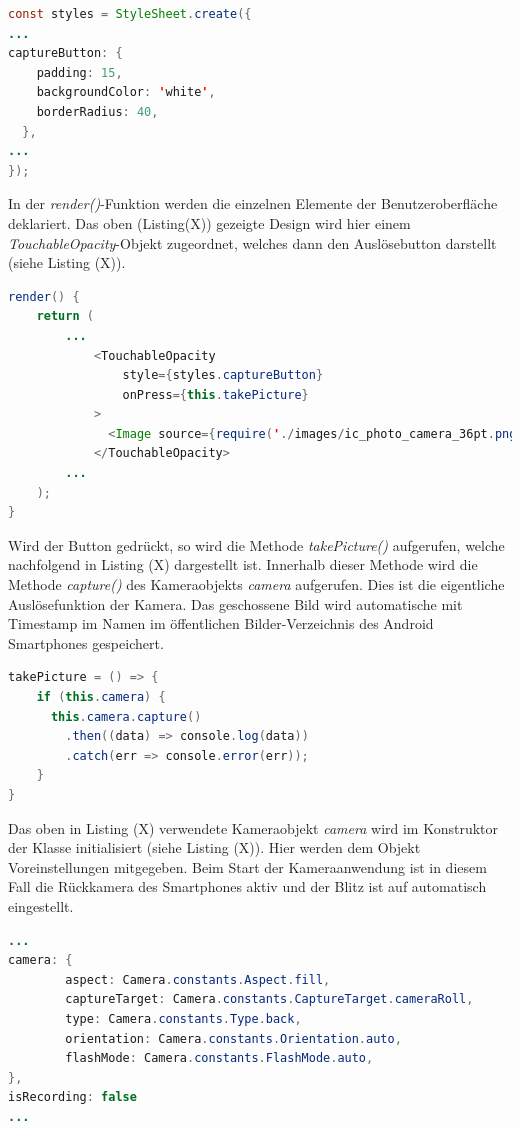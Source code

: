 \begin{lstlisting}[caption=Das Design des Auslösebuttons für die Kamerafunktion, label=lst:styleCaptureButton, language=Java]
const styles = StyleSheet.create({
...
captureButton: {
    padding: 15,
    backgroundColor: 'white',
    borderRadius: 40,
  },
...
});
\end{lstlisting} 

In der \textit{render()}-Funktion werden die einzelnen Elemente der Benutzeroberfläche deklariert. Das oben (Listing(X)) gezeigte Design wird hier einem \textit{TouchableOpacity}-Objekt zugeordnet, welches dann den Auslösebutton darstellt (siehe Listing (X)). 

\begin{lstlisting}[caption=Deklaration eines \textit{TouchableOpacity}-UI-Objekts für die Darstellung des Auslösebuttons der Kamera, label=lst:CaptureButton, language=Java]
render() {
    return (
		...
			<TouchableOpacity
                style={styles.captureButton}
                onPress={this.takePicture}
            >
              <Image source={require('./images/ic_photo_camera_36pt.png')}/>
            </TouchableOpacity>
		...
	);
}
\end{lstlisting} 

Wird der Button gedrückt, so wird die Methode \textit{takePicture()} aufgerufen, welche nachfolgend in Listing (X) dargestellt ist. Innerhalb dieser Methode wird die Methode \textit{capture()} des Kameraobjekts \textit{camera} aufgerufen. Dies ist die eigentliche Auslösefunktion der Kamera. Das geschossene Bild wird automatische mit Timestamp im Namen im öffentlichen Bilder-Verzeichnis des Android Smartphones gespeichert. 

\begin{lstlisting}[caption=Die Methode \textit{takePicture()} zum Auslösen der Kamera, label=lst:takePictureReactNative, language=Java]
takePicture = () => {
    if (this.camera) {
      this.camera.capture()
        .then((data) => console.log(data))
        .catch(err => console.error(err));
    }
}
\end{lstlisting} 

Das oben in Listing (X) verwendete Kameraobjekt \textit{camera} wird im Konstruktor der Klasse initialisiert (siehe Listing (X)). Hier werden dem Objekt Voreinstellungen mitgegeben. Beim Start der Kameraanwendung ist in diesem Fall die Rückkamera des Smartphones aktiv und der Blitz ist auf automatisch eingestellt. 
\clearpage

\begin{lstlisting}[caption=Initialisierung des Kameraobjekts im Konstruktor, label=lst:InitialisierungCameraRN, language=Java]
...
camera: {
        aspect: Camera.constants.Aspect.fill,
        captureTarget: Camera.constants.CaptureTarget.cameraRoll,
        type: Camera.constants.Type.back,
        orientation: Camera.constants.Orientation.auto,
        flashMode: Camera.constants.FlashMode.auto,
},
isRecording: false
...
\end{lstlisting}


